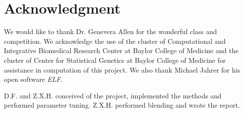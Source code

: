 \documentclass[journal]{IEEEtran}
\begin{document}
% 

\section*{Acknowledgment}
We would like to thank Dr. Genevera Allen for the wonderful class and competition. We acknowledge the use of the cluster of Computational and Integrative Biomedical Research Center at Baylor College of Medicine and the cluster of Center for Statistical Genetics at Baylor College of Medicine for assistance in computation of this project. We also thank Michael Jahrer for his open software {\it ELF}. 

D.F. and Z.X.H. conceived of the project, implemented the methods and performed parameter tuning. Z.X.H. performed blending and wrote the report.  

\ifCLASSOPTIONcaptionsoff
  \newpage
\fi



\end{document}
